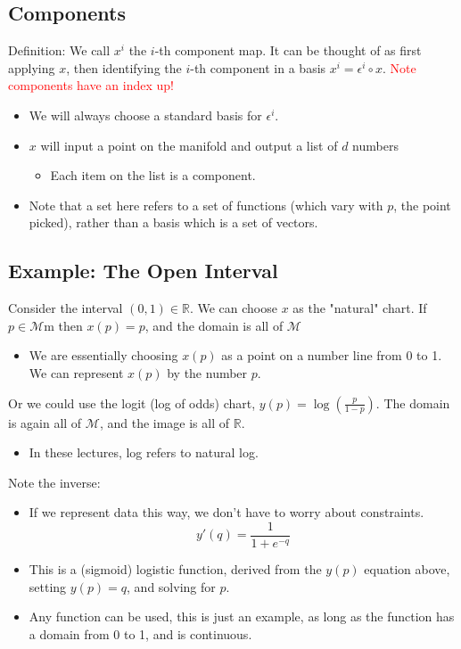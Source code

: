 \documentclass[10pt]{article}
\begin{document}
\subsection*{Components}
Definition: We call $x^i$ the $i$-th component map.  It can be thought of as first applying $x$, then identifying the $i$-th component in a basis $x^i = \epsilon^i \circ x$. \textcolor{red}{Note components have an index up!}
\begin{itemize}
    \item We will always choose a standard basis for $\epsilon^i$.
    \item $x$ will input a point on the manifold and output a list of $d$ numbers
    \begin{itemize}
        \item Each item on the list is a component.
    \end{itemize}
    \item Note that a set here refers to a set of functions (which vary with $p$, the point picked), rather than a basis which is a set of vectors.
\end{itemize}

\subsection*{Example: The Open Interval}
Consider the interval $(0, 1) \in \mathbb{R}$.  We can choose $x$ as the "natural" chart.  If $p \in \mathcal{M}$m then $x(p) = p$, and the domain is all of $\mathcal{M}$
\begin{itemize}
    \item We are essentially choosing $x(p)$ as a point on a number line from 0 to 1.  We can represent $x(p)$ by the number $p$.
\end{itemize}
Or we could use the logit (log of odds) chart, $y(p) = \log \left(\frac{p}{1 - p}\right)$.  The domain is again all of $\mathcal{M}$, and the image is all of $\mathbb{R}$. 
\begin{itemize}
    \item In these lectures, log refers to natural log.
\end{itemize}
Note the inverse:
\begin{itemize}
    \item If we represent data this way, we don't have to worry about constraints.
    \[y'(q) = \frac{1}{1 + e^{-q}}\]
    \item This is a (sigmoid) logistic function, derived from the $y(p)$ equation above, setting $y(p) = q$, and solving for $p$.
    \item Any function can be used, this is just an example, as long as the function has a domain from 0 to 1, and is continuous.
\end{itemize}
\end{document}

